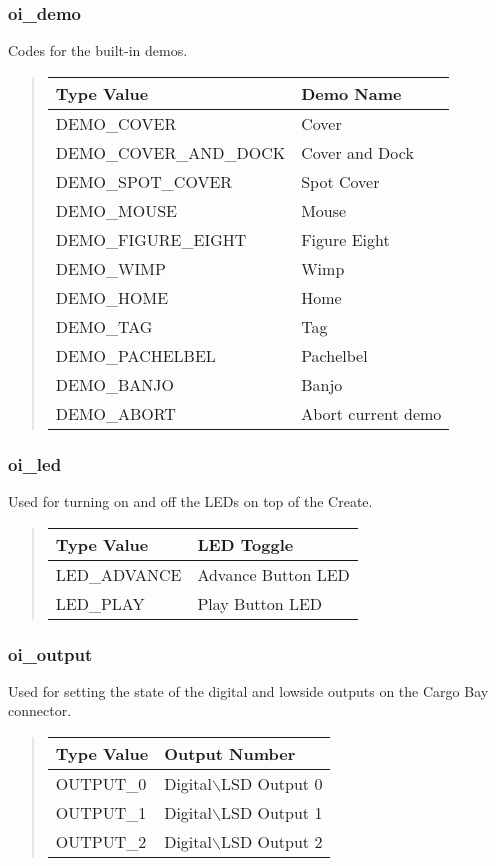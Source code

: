 \documentclass {article}
\begin{document}
\subsubsection {oi\_demo} \hypertarget{oidemo}{}
Codes for the built-in demos.
\begin {quote}
  \begin {tabular}{l|l}
    {\sf Type Value} & {\sf Demo Name} \\
    \hline
    DEMO\_COVER & Cover \\
    DEMO\_COVER\_AND\_DOCK & Cover and Dock \\
    DEMO\_SPOT\_COVER & Spot Cover \\
    DEMO\_MOUSE & Mouse \\
    DEMO\_FIGURE\_EIGHT & Figure Eight \\
    DEMO\_WIMP & Wimp \\
    DEMO\_HOME & Home \\
    DEMO\_TAG & Tag \\
    DEMO\_PACHELBEL & Pachelbel \\
    DEMO\_BANJO & Banjo \\
    DEMO\_ABORT & Abort current demo \\
  \end {tabular}
\end {quote}

\subsubsection {oi\_led} \hypertarget{oiled}{}
Used for turning on and off the LEDs on top of the Create.
\begin {quote}
  \begin {tabular}{l|l}
    {\sf Type Value} & {\sf LED Toggle} \\
    \hline
    LED\_ADVANCE & Advance Button LED \\
    LED\_PLAY & Play Button LED \\
  \end {tabular}
\end{quote}

\subsubsection {oi\_output} \hypertarget{oioutput}{}
Used for setting the state of the digital and lowside outputs on the Cargo Bay connector.
\begin {quote}
  \begin {tabular}{l|l}
    {\sf Type Value} & {\sf Output Number} \\
    \hline
    OUTPUT\_0 & Digital$\backslash$LSD Output 0 \\
    OUTPUT\_1 & Digital$\backslash$LSD Output 1 \\
    OUTPUT\_2 & Digital$\backslash$LSD Output 2 \\
  \end {tabular}
\end {quote}
\end{document}

